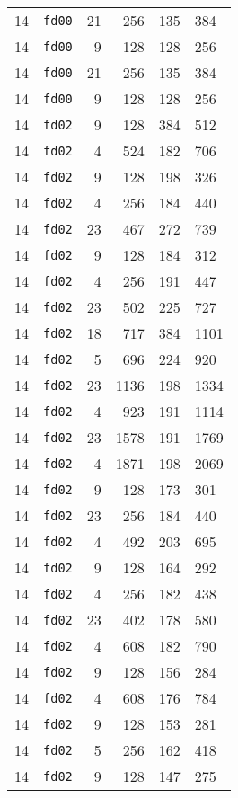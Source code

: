 \documentclass{article}
\begin{document}
\begin{table}[h!]
\begin{tabular}{llrrrl}
    14 & \texttt{fd00} & 21 & 256 & 135 & 384 \\
    14 & \texttt{fd00} & 9 & 128 & 128 & 256 \\
    14 & \texttt{fd00} & 21 & 256 & 135 & 384 \\
    14 & \texttt{fd00} & 9 & 128 & 128 & 256 \\
    14 & \texttt{fd02} & 9 & 128 & 384 & 512 \\
    14 & \texttt{fd02} & 4 & 524 & 182 & 706 \\
    14 & \texttt{fd02} & 9 & 128 & 198 & 326 \\
    14 & \texttt{fd02} & 4 & 256 & 184 & 440 \\
    14 & \texttt{fd02} & 23 & 467 & 272 & 739 \\
    14 & \texttt{fd02} & 9 & 128 & 184 & 312 \\
    14 & \texttt{fd02} & 4 & 256 & 191 & 447 \\
    14 & \texttt{fd02} & 23 & 502 & 225 & 727 \\
    14 & \texttt{fd02} & 18 & 717 & 384 & 1101 \\
    14 & \texttt{fd02} & 5 & 696 & 224 & 920 \\
    14 & \texttt{fd02} & 23 & 1136 & 198 & 1334 \\
    14 & \texttt{fd02} & 4 & 923 & 191 & 1114 \\
    14 & \texttt{fd02} & 23 & 1578 & 191 & 1769 \\
    14 & \texttt{fd02} & 4 & 1871 & 198 & 2069 \\
    14 & \texttt{fd02} & 9 & 128 & 173 & 301 \\
    14 & \texttt{fd02} & 23 & 256 & 184 & 440 \\
    14 & \texttt{fd02} & 4 & 492 & 203 & 695 \\
    14 & \texttt{fd02} & 9 & 128 & 164 & 292 \\
    14 & \texttt{fd02} & 4 & 256 & 182 & 438 \\
    14 & \texttt{fd02} & 23 & 402 & 178 & 580 \\
    14 & \texttt{fd02} & 4 & 608 & 182 & 790 \\
    14 & \texttt{fd02} & 9 & 128 & 156 & 284 \\
    14 & \texttt{fd02} & 4 & 608 & 176 & 784 \\
    14 & \texttt{fd02} & 9 & 128 & 153 & 281 \\
    14 & \texttt{fd02} & 5 & 256 & 162 & 418 \\
    14 & \texttt{fd02} & 9 & 128 & 147 & 275 \\

\end{tabular}
\end{table}
\end{document}
